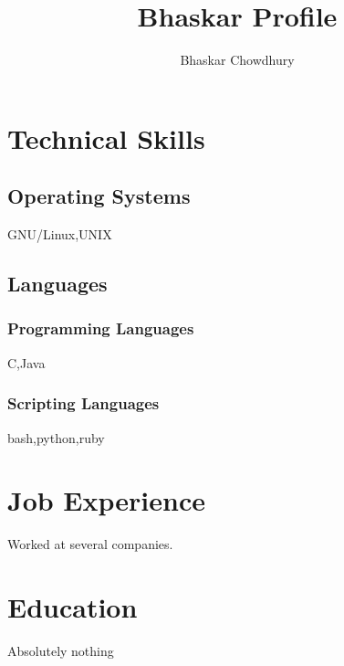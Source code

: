 \documentclass{article}
\begin{document}
\title{Bhaskar Profile}
\author{Bhaskar Chowdhury}

\maketitle

\section{Technical Skills}


\subsection{Operating Systems}
GNU/Linux,UNIX

\subsection{Languages}

\subsubsection{Programming Languages}
C,Java


\subsubsection{Scripting Languages}
bash,python,ruby




\section{Job Experience}
Worked at several companies.


\section{Education}
Absolutely nothing
\end{document}
